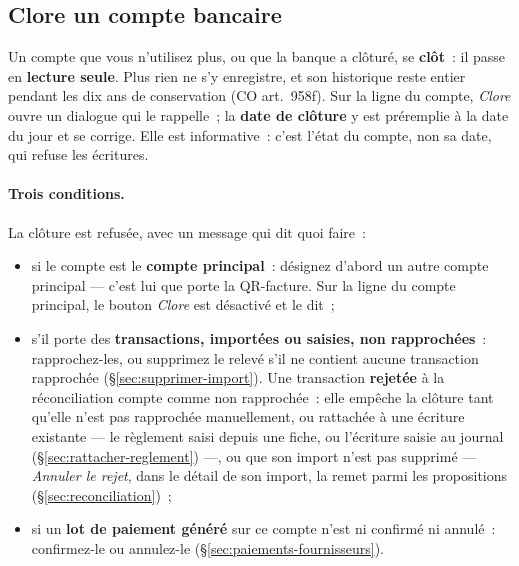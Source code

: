 \documentclass[a4paper,11pt,oneside]{article}
\begin{document}
\subsection{Clore un compte bancaire}\label{sec:clore-compte-bancaire}

Un compte que vous n'utilisez plus, ou que la banque a clôturé, se \textbf{clôt}~: il passe en
\textbf{lecture seule}. Plus rien ne s'y enregistre, et son historique reste entier pendant les
dix ans de conservation (CO art.~958f). Sur la ligne du compte, \emph{Clore} ouvre un dialogue
qui le rappelle~; la \textbf{date de clôture} y est préremplie à la date du jour et se corrige.
Elle est informative~: c'est l'état du compte, non sa date, qui refuse les écritures.

\paragraph{Trois conditions.} La clôture est refusée, avec un message qui dit quoi faire~:
\begin{itemize}
    \item si le compte est le \textbf{compte principal}~: désignez d'abord un autre compte
          principal --- c'est lui que porte la QR-facture. Sur la ligne du compte principal, le
          bouton \emph{Clore} est désactivé et le dit~;
    \item s'il porte des \textbf{transactions, importées ou saisies, non rapprochées}~:
          rapprochez-les, ou supprimez le relevé s'il ne contient aucune transaction rapprochée
          (\S\ref{sec:supprimer-import}). Une transaction \textbf{rejetée} à la réconciliation
          compte comme non rapprochée~: elle empêche la clôture tant qu'elle n'est pas
          rapprochée manuellement, ou rattachée à une écriture existante --- le règlement
          saisi depuis une fiche, ou l'écriture saisie au journal
          (\S\ref{sec:rattacher-reglement}) ---, ou que son import n'est pas supprimé --- \emph{Annuler le
          rejet}, dans le détail de son import, la remet parmi les propositions
          (\S\ref{sec:reconciliation})~;
    \item si un \textbf{lot de paiement généré} sur ce compte n'est ni confirmé ni annulé~:
          confirmez-le ou annulez-le (\S\ref{sec:paiements-fournisseurs}).
\end{itemize}
\end{document}

